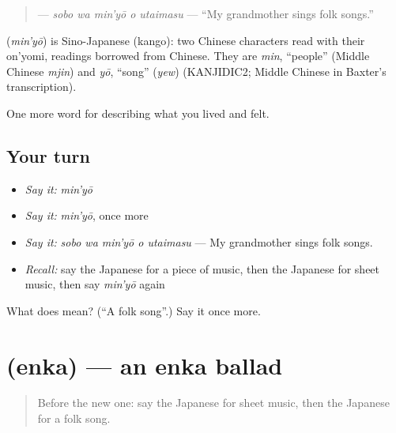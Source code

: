 \begin{quote}
\textbf{  } — \emph{sobo wa min'yō o utaimasu} — \textquotedblleft{}My grandmother sings folk songs.\textquotedblright{}
\end{quote}

\begin{cousinweb}
\textbf{} (\emph{min'yō}) is Sino-Japanese (kango): two Chinese characters read with their on'yomi, readings borrowed from Chinese. They are \emph{min}, \textquotedblleft{}people\textquotedblright{} (Middle Chinese \emph{mjin}) and \emph{yō}, \textquotedblleft{}song\textquotedblright{} (\emph{yew}) (KANJIDIC2; Middle Chinese in Baxter's transcription).
\end{cousinweb}

\begin{grammarlens}[title={What you've built}]
One more word for describing what you lived and felt.
\end{grammarlens}

\subsection*{Your turn}
\begin{itemize}
\raggedright
  \item \emph{Say it:} \emph{min'yō}
  \item \emph{Say it:} \emph{min'yō}, once more
  \item \emph{Say it:} \emph{sobo wa min'yō o utaimasu} — My grandmother sings folk songs.
  \item \emph{Recall:} say the Japanese for a piece of music, then the Japanese for sheet music, then say \emph{min'yō} again
\end{itemize}

\begin{tcolorbox}[breakable,colback=teal!4,colframe=teal!35!black,title={Before you move on}]
What does  mean? (\textquotedblleft{}A folk song\textquotedblright{}.) Say it once more.
\end{tcolorbox}
\section[\texorpdfstring{\ja{えんか} (enka)}{えんか (enka)}]{ (enka) — an enka ballad}

\label{lesson:JA-C470-enka}



\begin{quote}
Before the new one: say the Japanese for sheet music, then the Japanese for a folk song.
\end{quote}

